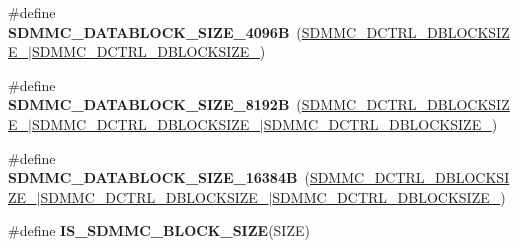 \begin{DoxyCompactItemize}
\item 
\mbox{\label{group___s_d_m_m_c___l_l___data___block___size_gae8997b7dddb5fc8934d2bb06007fb4c0}} 
\#define {\bfseries S\+D\+M\+M\+C\+\_\+\+D\+A\+T\+A\+B\+L\+O\+C\+K\+\_\+\+S\+I\+Z\+E\+\_\+4096B}~(\mbox{\hyperlink{group___peripheral___registers___bits___definition_ga4bd54ea3ef213738e740a02667bc2d1f}{S\+D\+M\+M\+C\+\_\+\+D\+C\+T\+R\+L\+\_\+\+D\+B\+L\+O\+C\+K\+S\+I\+Z\+E\+\_}}$\vert$\mbox{\hyperlink{group___peripheral___registers___bits___definition_ga70acaa28f679dee46b20847e6627b80c}{S\+D\+M\+M\+C\+\_\+\+D\+C\+T\+R\+L\+\_\+\+D\+B\+L\+O\+C\+K\+S\+I\+Z\+E\+\_}})
\item 
\mbox{\label{group___s_d_m_m_c___l_l___data___block___size_ga26f4443a2d9d44b8dace463374b4ef60}} 
\#define {\bfseries S\+D\+M\+M\+C\+\_\+\+D\+A\+T\+A\+B\+L\+O\+C\+K\+\_\+\+S\+I\+Z\+E\+\_\+8192B}~(\mbox{\hyperlink{group___peripheral___registers___bits___definition_gafacd555221e3b669839f2bdc24531c06}{S\+D\+M\+M\+C\+\_\+\+D\+C\+T\+R\+L\+\_\+\+D\+B\+L\+O\+C\+K\+S\+I\+Z\+E\+\_}}$\vert$\mbox{\hyperlink{group___peripheral___registers___bits___definition_ga4bd54ea3ef213738e740a02667bc2d1f}{S\+D\+M\+M\+C\+\_\+\+D\+C\+T\+R\+L\+\_\+\+D\+B\+L\+O\+C\+K\+S\+I\+Z\+E\+\_}}$\vert$\mbox{\hyperlink{group___peripheral___registers___bits___definition_ga70acaa28f679dee46b20847e6627b80c}{S\+D\+M\+M\+C\+\_\+\+D\+C\+T\+R\+L\+\_\+\+D\+B\+L\+O\+C\+K\+S\+I\+Z\+E\+\_}})
\item 
\mbox{\label{group___s_d_m_m_c___l_l___data___block___size_gac35b5578cd572cb93f0599f2b44af8c3}} 
\#define {\bfseries S\+D\+M\+M\+C\+\_\+\+D\+A\+T\+A\+B\+L\+O\+C\+K\+\_\+\+S\+I\+Z\+E\+\_\+16384B}~(\mbox{\hyperlink{group___peripheral___registers___bits___definition_gaed289ccb613a89c9fbada5cd541b88c4}{S\+D\+M\+M\+C\+\_\+\+D\+C\+T\+R\+L\+\_\+\+D\+B\+L\+O\+C\+K\+S\+I\+Z\+E\+\_}}$\vert$\mbox{\hyperlink{group___peripheral___registers___bits___definition_ga4bd54ea3ef213738e740a02667bc2d1f}{S\+D\+M\+M\+C\+\_\+\+D\+C\+T\+R\+L\+\_\+\+D\+B\+L\+O\+C\+K\+S\+I\+Z\+E\+\_}}$\vert$\mbox{\hyperlink{group___peripheral___registers___bits___definition_ga70acaa28f679dee46b20847e6627b80c}{S\+D\+M\+M\+C\+\_\+\+D\+C\+T\+R\+L\+\_\+\+D\+B\+L\+O\+C\+K\+S\+I\+Z\+E\+\_}})
\item 
\#define {\bfseries I\+S\+\_\+\+S\+D\+M\+M\+C\+\_\+\+B\+L\+O\+C\+K\+\_\+\+S\+I\+ZE}(S\+I\+ZE)
\end{DoxyCompactItemize}


